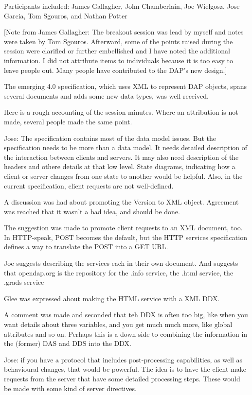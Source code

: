 
Participants included: James Gallagher, John Chamberlain, Joe
Wielgosz, Jose Garcia, Tom Sgouros, and Nathan Potter

[Note from James Gallagher: The breakout session was lead by myself
and notes were taken by Tom Sgouros.  Afterward, some of the points
raised during the session were clarified or further embellished and I
have noted the additional information. I did not attribute items to
individuals because it is too easy to leave people out.  Many people
have contributed to the DAP's new design.]

The emerging 4.0 specification, which uses XML to represent DAP objects,
spans several documents and adds some new data types, was well received.

Here is a rough accounting of the session minutes.  Where an
attribution is not made, several people made the same point.

Jose: The specification contains most of the data model issues.  But
the specification needs to be more than a data model.  It needs
detailed description of the interaction between clients and servers.
It may also need description of the headers and othere details at that
low level.  State diagrams, indicating how a client or server changes
from one state to another would be helpful.  Also, in the current
specification, client requests are not well-defined.  

A discussion was had about promoting the Version to XML object.
Agreement was reached that it wasn't a bad idea, and should be done.

The suggestion was made to promote client requests to an XML document,
too.  In HTTP-speak, POST becomes the default, but the HTTP services
specification defines a way to translate the POST into a GET URL.

Joe suggests describing the services each in their own document.  And
suggests that opendap.org is the repository for the .info service, the
.html service, the .grads service

Glee was expressed about making the HTML service with a XML DDX.

A comment was made and seconded that teh DDX is often too big, like
when you want details about three variables, and you get much much
more, like global attributes and so on.  Perhaps this is a down side
to combining the information in the (former) DAS and DDS into the
DDX. 

Jose: if you have a protocol that includes post-processing
capabilities, as well as behavioural changes, that would be powerful.
The idea is to have the client make requests from the server that have
some detailed processing steps.  These would be made with some kind of
server directives.

